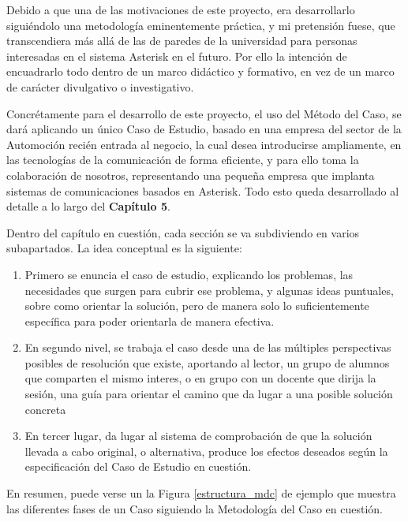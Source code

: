Debido a que una de las motivaciones de este proyecto, era desarrollarlo siguiéndolo una metodología eminentemente práctica, y mi pretensión fuese, que transcendiera más allá de las de paredes de la universidad para personas interesadas en el sistema Asterisk en el futuro. Por ello la intención de encuadrarlo todo dentro de un marco didáctico y formativo, en vez de un marco de carácter divulgativo o investigativo.

Concrétamente para el desarrollo de este proyecto, el uso del Método del Caso, se dará aplicando un único Caso de Estudio, basado en una empresa del sector de la Automoción recién entrada al negocio, la cual desea introducirse ampliamente, en las tecnologías de la comunicación de forma eficiente, y para ello toma la colaboración de nosotros, representando una pequeña empresa que implanta sistemas de comunicaciones basados en Asterisk. Todo esto queda desarrollado al detalle a lo largo del \textbf{Capítulo 5}.

Dentro del capítulo en cuestión, cada sección se va subdiviendo en varios subapartados. La idea conceptual es la siguiente:


\begin{enumerate}
	\item Primero se enuncia el caso de estudio, explicando los problemas, las necesidades que surgen para cubrir ese problema, y algunas ideas puntuales, sobre como orientar la solución, pero de manera solo lo suficientemente específica para poder orientarla de manera efectiva.
	\item En segundo nivel, se trabaja el caso desde una de las múltiples perspectivas posibles de resolución que existe, aportando al lector, un grupo de alumnos que comparten el mismo interes, o en grupo con un docente que dirija la sesión, una guía para orientar el camino que da lugar a una posible solución concreta
	\item En tercer lugar, da lugar al sistema de comprobación de que la solución llevada a cabo original, o alternativa, produce los efectos deseados según la especificación del Caso de Estudio en cuestión.
\end{enumerate}

En resumen, puede verse un la Figura \ref{estructura_mdc} de ejemplo que muestra las diferentes fases de un Caso siguiendo la Metodología del Caso en cuestión.


